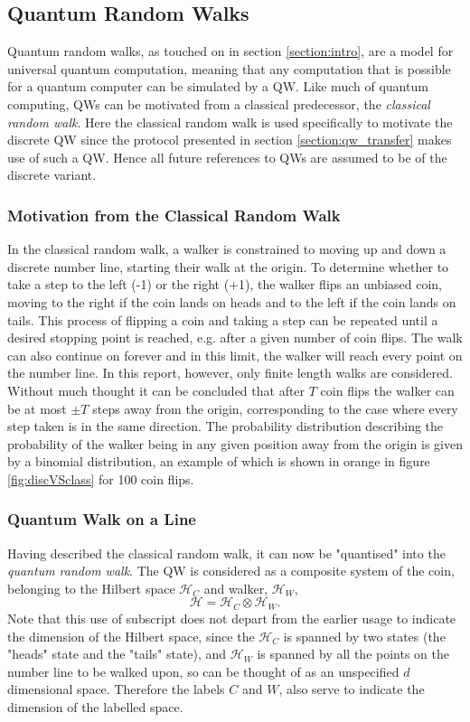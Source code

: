 \subsection{Quantum Random Walks}
Quantum random walks, as touched on in section \ref{section:intro}, are a model for universal quantum computation, meaning that any computation that is possible for a quantum computer can be simulated by a QW.
Like much of quantum computing, QWs can be motivated from a classical predecessor, the \emph{classical random walk}.
Here the classical random walk is used specifically to motivate the discrete QW since the protocol presented in section \ref{section:qw_transfer} makes use of such a QW.
Hence all future references to QWs are assumed to be of the discrete variant.

\subsubsection{Motivation from the Classical Random Walk}
\label{subsubsection:classc_r_w}
In the classical random walk, a walker is constrained to moving up and down a discrete number line, starting their walk at the origin.
To determine whether to take a step to the left (-1) or the right (+1), the walker flips an unbiased coin, moving to the right if the coin lands on heads and to the left if the coin lands on tails. 
This process of flipping a coin and taking a step can be repeated until a desired stopping point is reached, e.g. after a given number of coin flips.
The walk can also continue on forever and in this limit, the walker will reach every point on the number line.
In this report, however, only finite length walks are considered.
Without much thought it can be concluded that after $T$ coin flips the walker can be at most $\pm T$ steps away from the origin, corresponding to the case where every step taken is in the same direction.
The probability distribution describing the probability of the walker being in any given position away from the origin is given by a binomial distribution, an example of which is shown in orange in figure \ref{fig:discVSclass} for 100 coin flips.

\subsubsection{Quantum Walk on a Line}
\label{subsubsection:q_r_w}
Having described the classical random walk, it can now be "quantised" into the \emph{quantum random walk}.
The QW is considered as a composite system of the coin, belonging to the Hilbert space $\mathcal{H}_C$ and walker, $\mathcal{H}_W$,
\begin{equation}
    \mathcal{H} = \mathcal{H}_C \otimes \mathcal{H}_W.
\end{equation}
Note that this use of subscript does not depart from the earlier usage to indicate the dimension of the Hilbert space, since the $\mathcal{H}_C$ is spanned by two states (the "heads" state and the "tails" state), and $\mathcal{H}_W$ is spanned by all the points on the number line to be walked upon, so can be thought of as an unspecified $d$ dimensional space.
Therefore the labels $C$ and $W$, also serve to indicate the dimension of the labelled space.

